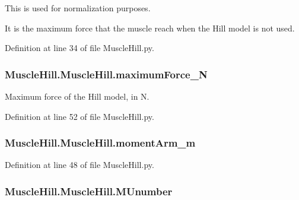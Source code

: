 This is used for normalization purposes. 

It is the maximum force that the muscle reach when the Hill model is not used. 

Definition at line 34 of file Muscle\+Hill.\+py.

\subsubsection[{\texorpdfstring{maximum\+Force\+\_\+N}{maximumForce_N}}]{\setlength{\rightskip}{0pt plus 5cm}Muscle\+Hill.\+Muscle\+Hill.\+maximum\+Force\+\_\+N}\hypertarget{class_muscle_hill_1_1_muscle_hill_aae70340f27634c6246b6e58940e37590}{}\label{class_muscle_hill_1_1_muscle_hill_aae70340f27634c6246b6e58940e37590}


Maximum force of the Hill model, in N. 



Definition at line 52 of file Muscle\+Hill.\+py.

\subsubsection[{\texorpdfstring{moment\+Arm\+\_\+m}{momentArm_m}}]{\setlength{\rightskip}{0pt plus 5cm}Muscle\+Hill.\+Muscle\+Hill.\+moment\+Arm\+\_\+m}\hypertarget{class_muscle_hill_1_1_muscle_hill_af8d3e20d106fb65cb984644c8d6df418}{}\label{class_muscle_hill_1_1_muscle_hill_af8d3e20d106fb65cb984644c8d6df418}


Definition at line 48 of file Muscle\+Hill.\+py.

\subsubsection[{\texorpdfstring{M\+Unumber}{MUnumber}}]{\setlength{\rightskip}{0pt plus 5cm}Muscle\+Hill.\+Muscle\+Hill.\+M\+Unumber}\hypertarget{class_muscle_hill_1_1_muscle_hill_aad139563902bc26e0c69637ddc85c6b7}{}\label{class_muscle_hill_1_1_muscle_hill_aad139563902bc26e0c69637ddc85c6b7}


